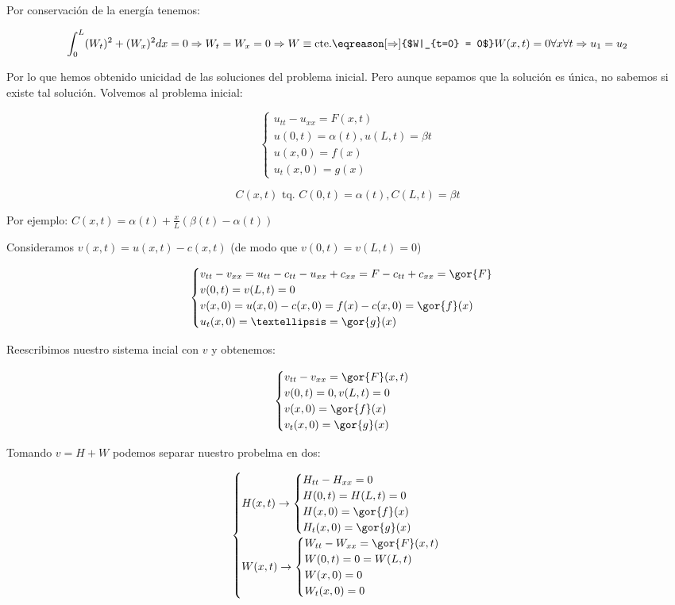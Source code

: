 		 	Por conservación de la energía tenemos:

		 	\[ \int_0^L (W_t)^2 + (W_x)^2 dx = 0 \Rightarrow W_t = W_x = 0 \Rightarrow W \equiv \text{cte.} \eqreason[\Rightarrow]{$W|_{t=0} = 0$} W(x,t) = 0 \forall x \forall t \Rightarrow u_1 = u_2 \]

		 	Por lo que hemos obtenido unicidad de las soluciones del problema inicial. Pero aunque sepamos que la solución es única, no sabemos si existe tal solución. Volvemos al problema inicial:

		 	\[ \begin{cases}
		 		u_{tt} - u_{xx} = F(x,t)\\
		 		u(0,t) = \alpha(t), u(L,t) = \beta{t} \\
		 		u(x,0) = f(x) \\
		 		u_t(x,0) = g(x)
		 	\end{cases}\]


		 	\[ C(x,t) \text{ tq. } C(0,t) = \alpha(t), C(L,t) = \beta{t}\]

		 	Por ejemplo: $C(x,t) = \alpha(t) + \frac{x}{L} (\beta(t)-\alpha(t))$

		 	Consideramos $v(x,t) = u(x,t) - c(x,t)$ (de modo que $v(0,t) = v(L,t) = 0$)

		 	\[\begin{cases}
		 		v_{tt} - v_{xx} = u_{tt} - c_{tt} - u_{xx} + c_{xx} = F - c_{tt} + c_{xx} = \gor{F} \\
		 		v(0,t) = v(L,t) = 0 \\
		 		v(x,0) = u(x,0) - c(x,0) = f(x) - c(x,0) = \gor{f}(x) \\
		 		u_t (x,0) = … = \gor{g}(x)
		 	\end{cases}
		 	\]

		 	Reescribimos nuestro sistema incial con $v$ y obtenemos:

		 	\[ \begin{cases}
		 		v_{tt} - v_{xx} = \gor{F}(x,t)\\
		 		v(0,t) = 0, v(L,t) = 0 \\
		 		v(x,0) = \gor{f}(x) \\
		 		v_t(x,0) = \gor{g}(x)
		 	\end{cases}\]

		 	Tomando $v = H + W$ podemos separar nuestro probelma en dos:

		 	\[ \begin{cases}
		 			H(x,t) \rightarrow
		 			\begin{cases}
				 		H_{tt} - H_{xx} = 0\\
				 		H(0,t) = H(L,t) = 0 \\
				 		H(x,0) = \gor{f}(x) \\
				 		H_t(x,0) = \gor{g}(x)
			 		\end{cases}\\
			 		W(x,t) \rightarrow
			 		\begin{cases}
				 		W_{tt} - W_{xx} = \gor{F}(x,t)\\
				 		W(0,t) = 0 = W(L,t) \\
				 		W(x,0) = 0 \\
				 		W_t(x,0) = 0
				 	\end{cases}
				 \end{cases}
			\]

